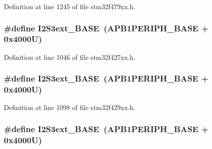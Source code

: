 Definition at line 1245 of file stm32f479xx.\+h.

\subsubsection[{\texorpdfstring{I2\+S3ext\+\_\+\+B\+A\+SE}{I2S3ext_BASE}}]{\setlength{\rightskip}{0pt plus 5cm}\#define I2\+S3ext\+\_\+\+B\+A\+SE~({\bf A\+P\+B1\+P\+E\+R\+I\+P\+H\+\_\+\+B\+A\+SE} + 0x4000\+U)}\hypertarget{group___peripheral__memory__map_ga89b61d6e6b09e94f3fccb7bef34e0263}{}\label{group___peripheral__memory__map_ga89b61d6e6b09e94f3fccb7bef34e0263}


Definition at line 1046 of file stm32f427xx.\+h.

\subsubsection[{\texorpdfstring{I2\+S3ext\+\_\+\+B\+A\+SE}{I2S3ext_BASE}}]{\setlength{\rightskip}{0pt plus 5cm}\#define I2\+S3ext\+\_\+\+B\+A\+SE~({\bf A\+P\+B1\+P\+E\+R\+I\+P\+H\+\_\+\+B\+A\+SE} + 0x4000\+U)}\hypertarget{group___peripheral__memory__map_ga89b61d6e6b09e94f3fccb7bef34e0263}{}\label{group___peripheral__memory__map_ga89b61d6e6b09e94f3fccb7bef34e0263}


Definition at line 1098 of file stm32f429xx.\+h.

\subsubsection[{\texorpdfstring{I2\+S3ext\+\_\+\+B\+A\+SE}{I2S3ext_BASE}}]{\setlength{\rightskip}{0pt plus 5cm}\#define I2\+S3ext\+\_\+\+B\+A\+SE~({\bf A\+P\+B1\+P\+E\+R\+I\+P\+H\+\_\+\+B\+A\+SE} + 0x4000\+U)}\hypertarget{group___peripheral__memory__map_ga89b61d6e6b09e94f3fccb7bef34e0263}{}\label{group___peripheral__memory__map_ga89b61d6e6b09e94f3fccb7bef34e0263}


